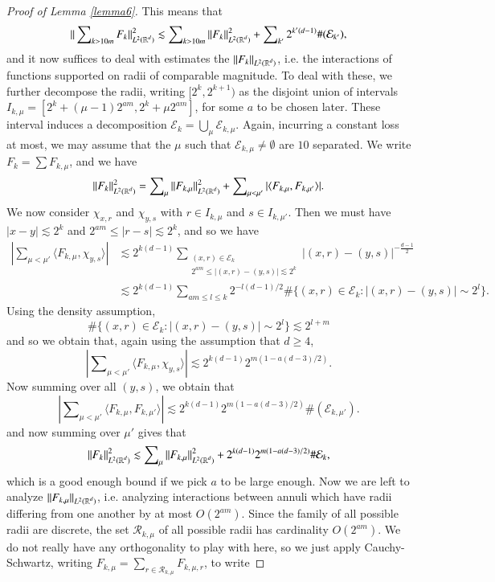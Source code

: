 \begin{proof}[Proof of Lemma \ref{lemma6}]
    This means that
    \[ \| \sum\nolimits_{k > 10m} F_k \|_{L^2(\operatorname{\mathbb{R}}^d)}^2 \lesssim \sum\nolimits_{k > 10m} \| F_k \|_{L^2(\operatorname{\mathbb{R}}^d)}^2 + \sum\nolimits_{k'} 2^{k'(d-1)} \# (\mathcal{E}_{k'}), \]
    and it now suffices to deal with estimates the $\| F_k \|_{L^2(\operatorname{\mathbb{R}}^d)}$, i.e. the interactions of functions supported on radii of comparable magnitude. To deal with these, we further decompose the radii, writing $[2^k,2^{k+1})$ as the disjoint union of intervals $I_{k,\mu} = [2^k + (\mu - 1) 2^{am}, 2^k + \mu 2^{am}]$, for some $a$ to be chosen later. These interval induces a decomposition $\mathcal{E}_k = \bigcup_\mu \mathcal{E}_{k,\mu}$. Again, incurring a constant loss at most, we may assume that the $\mu$ such that $\mathcal{E}_{k,\mu} \neq \emptyset$ are $10$ separated. We write $F_k = \sum F_{k,\mu}$, and we have
    \[ \| F_k \|_{L^2(\operatorname{\mathbb{R}}^d)}^2 = \sum\nolimits_\mu \| F_{k,\mu} \|_{L^2(\operatorname{\mathbb{R}}^d)}^2 + \sum\nolimits_{\mu < \mu'} |\langle F_{k,\mu}, F_{k,\mu'} \rangle|. \]
    We now consider $\chi_{x,r}$ and $\chi_{y,s}$ with $r \in I_{k,\mu}$ and $s \in I_{k,\mu'}$. Then we must have $|x - y| \lesssim 2^k$ and $2^{am} \leq |r - s| \lesssim 2^k$, and so we have
    \begin{align*}
        |\sum\nolimits_{\mu < \mu'} \langle F_{k,\mu}, \chi_{y,s} \rangle| &\lesssim 2^{k(d-1)} \sum\nolimits_{\substack{(x,r) \in \mathcal{E}_k\\ 2^{am} \leq |(x,r) - (y,s)| \lesssim 2^k}} |(x,r) - (y,s)|^{- \frac{d-1}{2}}\\
        &\lesssim 2^{k(d-1)} \sum\nolimits_{am \leq l \leq k} 2^{-l(d-1)/2} \# \{ (x,r) \in \mathcal{E}_k: |(x,r) - (y,s)| \sim 2^l \}.
    \end{align*}
    Using the density assumption,
    \[ \# \{ (x,r) \in \mathcal{E}_k: |(x,r) - (y,s)| \sim 2^l \} \lesssim 2^{l + m} \]
    and so we obtain that, again using the assumption that $d \geq 4$,
    \[ |\sum\nolimits_{\mu < \mu'} \langle F_{k,\mu}, \chi_{y,s} \rangle| \lesssim 2^{k(d-1)} 2^{m(1-a(d-3)/2)}. \]
    Now summing over all $(y,s)$, we obtain that
    \[ |\sum\nolimits_{\mu < \mu'} \langle F_{k,\mu}, F_{k,\mu'} \rangle| \lesssim 2^{k(d-1)} 2^{m(1 - a(d-3)/2)} \#(\mathcal{E}_{k,\mu'}). \]
    and now summing over $\mu'$ gives that
    \[ \| F_k \|_{L^2(\operatorname{\mathbb{R}}^d)}^2 \lesssim \sum\nolimits_\mu \| F_{k,\mu} \|_{L^2(\operatorname{\mathbb{R}}^d)}^2 + 2^{k(d-1)} 2^{m(1 - a(d-3)/2)} \# \mathcal{E}_k, \]
    which is a good enough bound if we pick $a$ to be large enough. Now we are left to analyze $\| F_{k,\mu} \|_{L^2(\operatorname{\mathbb{R}}^d)}$, i.e. analyzing interactions between annuli which have radii differing from one another by at most $O(2^{am})$. Since the family of all possible radii are discrete, the set $\mathcal{R}_{k,\mu}$ of all possible radii has cardinality $O(2^{am})$. We do not really have any orthogonality to play with here, so we just apply Cauchy-Schwartz, writing $F_{k,\mu} = \sum\nolimits_{r \in \mathcal{R}_{k,\mu}} F_{k,\mu,r}$, to write

\end{proof}
